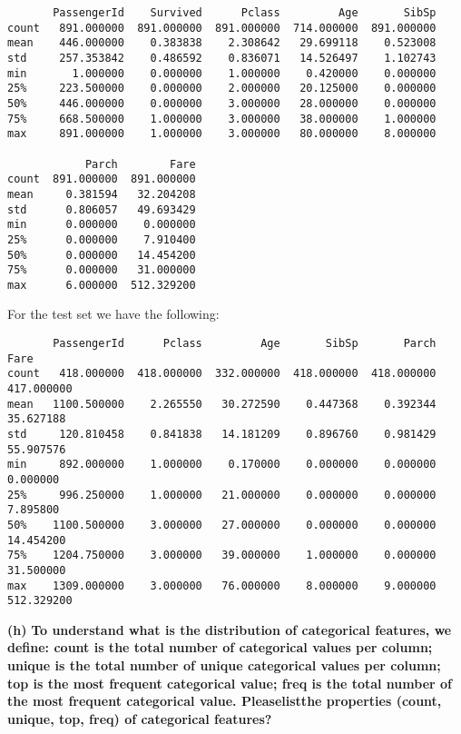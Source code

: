 \documentclass[11pt]{article}
\renewcommand\part[1]{\vspace{.10in}\textbf{(#1)}}
\begin{document}
\begin{verbatim}
       PassengerId    Survived      Pclass         Age       SibSp  
count   891.000000  891.000000  891.000000  714.000000  891.000000   
mean    446.000000    0.383838    2.308642   29.699118    0.523008   
std     257.353842    0.486592    0.836071   14.526497    1.102743   
min       1.000000    0.000000    1.000000    0.420000    0.000000   
25%     223.500000    0.000000    2.000000   20.125000    0.000000   
50%     446.000000    0.000000    3.000000   28.000000    0.000000   
75%     668.500000    1.000000    3.000000   38.000000    1.000000   
max     891.000000    1.000000    3.000000   80.000000    8.000000   

            Parch        Fare  
count  891.000000  891.000000  
mean     0.381594   32.204208  
std      0.806057   49.693429  
min      0.000000    0.000000  
25%      0.000000    7.910400  
50%      0.000000   14.454200  
75%      0.000000   31.000000  
max      6.000000  512.329200  
\end{verbatim}

For the test set we have the following:

\begin{verbatim}
       PassengerId      Pclass         Age       SibSp       Parch        Fare
count   418.000000  418.000000  332.000000  418.000000  418.000000  417.000000
mean   1100.500000    2.265550   30.272590    0.447368    0.392344   35.627188
std     120.810458    0.841838   14.181209    0.896760    0.981429   55.907576
min     892.000000    1.000000    0.170000    0.000000    0.000000    0.000000
25%     996.250000    1.000000   21.000000    0.000000    0.000000    7.895800
50%    1100.500000    3.000000   27.000000    0.000000    0.000000   14.454200
75%    1204.750000    3.000000   39.000000    1.000000    0.000000   31.500000
max    1309.000000    3.000000   76.000000    8.000000    9.000000  512.329200
\end{verbatim}


\part{h} \textbf{To understand what is the distribution of categorical features, we define:  count is the total number of categorical values per column; unique is the total number of unique categorical values per column; top is the most frequent categorical value; freq is the total number of the most frequent categorical value. Pleaselistthe properties (count, unique, top, freq) of categorical features? }
\end{document}
